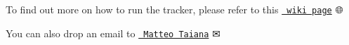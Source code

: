 To find out more on how to run the tracker, please refer to this \href{http://mediawiki.isr.ist.utl.pt/wiki/3D_ball_tracker}{\texttt{ wiki page}} 🌐

You can also drop an email to \href{mailto:mtaiana@isr.ist.utl.pt}{\texttt{ Matteo Taiana}} ✉ 